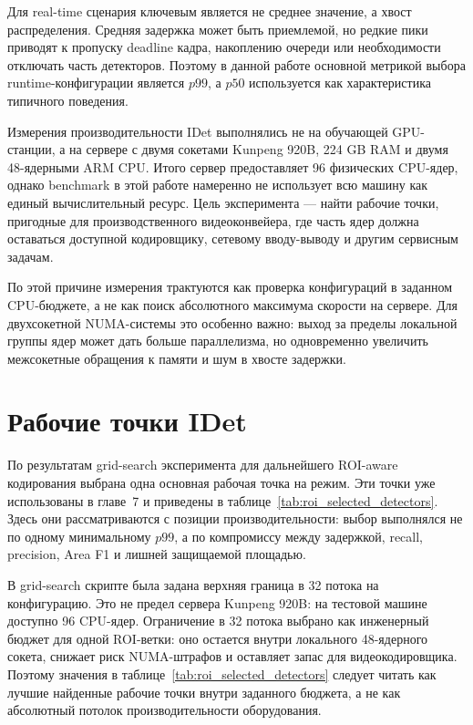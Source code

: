 \documentclass[12pt,a4paper,oneside,openany]{report}
\begin{document}
Для real-time сценария ключевым является не среднее значение, а хвост распределения. Средняя
задержка может быть приемлемой, но редкие пики приводят к пропуску deadline кадра, накоплению
очереди или необходимости отключать часть детекторов. Поэтому в данной работе основной метрикой
выбора runtime-конфигурации является $p99$, а $p50$ используется как характеристика типичного
поведения.

Измерения производительности IDet выполнялись не на обучающей GPU-станции, а на сервере с двумя
сокетами Kunpeng 920B, 224 GB RAM и двумя 48-ядерными ARM CPU. Итого сервер предоставляет
96 физических CPU-ядер, однако benchmark в этой работе намеренно не использует всю машину как
единый вычислительный ресурс. Цель эксперимента --- найти рабочие точки, пригодные для
производственного видеоконвейера, где часть ядер должна оставаться доступной кодировщику,
сетевому вводу-выводу и другим сервисным задачам.

По этой причине измерения трактуются как проверка конфигураций в заданном CPU-бюджете, а не как
поиск абсолютного максимума скорости на сервере. Для двухсокетной NUMA-системы это особенно
важно: выход за пределы локальной группы ядер может дать больше параллелизма, но одновременно
увеличить межсокетные обращения к памяти и шум в хвосте задержки.


\section{Рабочие точки IDet}

По результатам grid-search эксперимента для дальнейшего ROI-aware кодирования выбрана одна
основная рабочая точка на режим. Эти точки уже использованы в главе~7 и приведены в
таблице~\ref{tab:roi_selected_detectors}. Здесь они рассматриваются с позиции производительности:
выбор выполнялся не по одному минимальному $p99$, а по компромиссу между задержкой, recall,
precision, Area F1 и лишней защищаемой площадью.

В grid-search скрипте была задана верхняя граница в 32 потока на конфигурацию. Это не предел
сервера Kunpeng 920B: на тестовой машине доступно 96 CPU-ядер. Ограничение в 32 потока выбрано
как инженерный бюджет для одной ROI-ветки: оно остается внутри локального 48-ядерного сокета,
снижает риск NUMA-штрафов и оставляет запас для видеокодировщика. Поэтому значения в
таблице~\ref{tab:roi_selected_detectors} следует читать как лучшие найденные рабочие точки внутри
заданного бюджета, а не как абсолютный потолок производительности оборудования.
\end{document}
